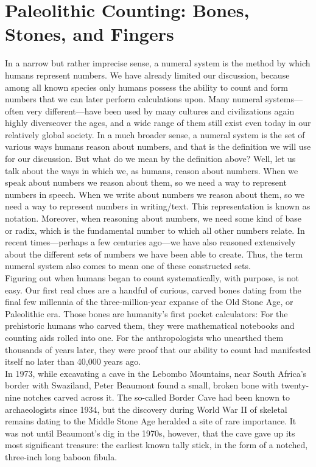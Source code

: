 \section{Paleolithic Counting: Bones, Stones, and Fingers}
In a narrow but rather imprecise sense, a numeral system is the method by which humans represent numbers. We have already limited our discussion, because among all known species only humans possess the ability to count and form numbers that we can later perform calculations upon. Many numeral systems—often very different—have been used by many cultures and civilizations again highly diverseover the ages, and a wide range of them still exist even today in our relatively global society. In a much broader sense, a numeral system is the set of various ways humans reason about numbers, and that is the definition we will use for our discussion. But what do we mean by the definition above? Well, let us talk about the ways in which we, as humans, reason about numbers. When we speak about numbers we reason about them, so we need a way to represent numbers in speech. When we write about numbers we reason about them, so we need a way to represent numbers in writing/text. This representation is known as notation. Moreover, when reasoning about numbers, we need some kind of base or radix, which is the fundamental number to which all other numbers relate. In recent times—perhaps a few centuries ago—we have also reasoned extensively about the different sets of numbers we have been able to create. Thus, the term numeral system also comes to mean one of these constructed sets.\cite{weibull_numbersystems} \\ 
Figuring out when humans began to count systematically, with purpose, is not easy. Our first real clues are a handful of curious, carved bones dating from the final few millennia of the three-million-year expanse of the Old Stone Age, or Paleolithic era. Those bones are humanity’s first pocket calculators: For the prehistoric humans who carved them, they were mathematical notebooks and counting aids rolled into one. For the anthropologists who unearthed them thousands of years later, they were proof that our ability to count had manifested itself no later than 40,000 years ago.\\
In 1973, while excavating a cave in the Lebombo Mountains, near South Africa’s border with Swaziland, Peter Beaumont found a small, broken bone with twenty-nine notches carved across it. The so-called Border Cave had been known to archaeologists since 1934, but the discovery during World War II of skeletal remains dating to the Middle Stone Age heralded a site of rare importance. It was not until Beaumont’s dig in the 1970s, however, that the cave gave up its most significant treasure: the earliest known tally stick, in the form of a notched, three-inch long baboon fibula.\\

